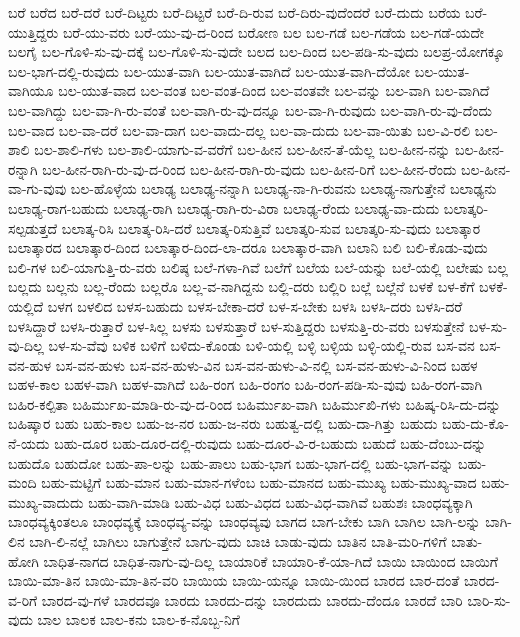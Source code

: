 {ಬರೆ
ಬರೆದ
ಬರೆ-ದರೆ
ಬರೆ-ದಿಟ್ಟರು
ಬರೆ-ದಿಟ್ಟರೆ
ಬರೆ-ದಿ-ರುವ
ಬರೆ-ದಿರು-ವುದೆಂದರೆ
ಬರೆ-ದುದು
ಬರೆಯ
ಬರೆ-ಯುತ್ತಿದ್ದರು
ಬರೆ-ಯು-ವರು
ಬರೆ-ಯು-ವು-ದ-ರಿಂದ
ಬರೋಣ
ಬಲ
ಬಲ-ಗಡೆ
ಬಲ-ಗಡೆಯ
ಬಲ-ಗಡೆ-ಯದೇ
ಬಲಗೈ
ಬಲ-ಗೊಳಿ-ಸು-ವು-ದಕ್ಕೆ
ಬಲ-ಗೊಳಿ-ಸು-ವುದೇ
ಬಲದ
ಬಲ-ದಿಂದ
ಬಲ-ಪಡಿ-ಸು-ವುದು
ಬಲಪ್ರ-ಯೋಗಕ್ಕೂ
ಬಲ-ಭಾಗ-ದಲ್ಲಿ-ರುವುದು
ಬಲ-ಯುತ-ವಾಗಿ
ಬಲ-ಯುತ-ವಾಗಿದೆ
ಬಲ-ಯುತ-ವಾಗಿ-ದೆಯೋ
ಬಲ-ಯುತ-ವಾಗಿಯೂ
ಬಲ-ಯುತ-ವಾದ
ಬಲ-ವಂತ
ಬಲ-ವಂತ-ದಿಂದ
ಬಲ-ವಂತವೇ
ಬಲ-ವನ್ನು
ಬಲ-ವಾಗಿ
ಬಲ-ವಾಗಿದೆ
ಬಲ-ವಾಗಿದ್ದು
ಬಲ-ವಾ-ಗಿ-ರು-ವಂತೆ
ಬಲ-ವಾಗಿ-ರು-ವು-ದನ್ನೂ
ಬಲ-ವಾ-ಗಿ-ರುವುದು
ಬಲ-ವಾಗಿ-ರು-ವು-ದೆಂದು
ಬಲ-ವಾದ
ಬಲ-ವಾ-ದರೆ
ಬಲ-ವಾ-ದಾಗ
ಬಲ-ವಾದು-ದಲ್ಲ
ಬಲ-ವಾ-ದುದು
ಬಲ-ವಾ-ಯಿತು
ಬಲ-ವಿ-ರಲಿ
ಬಲ-ಶಾಲಿ
ಬಲ-ಶಾಲಿ-ಗಳು
ಬಲ-ಶಾಲಿ-ಯಾಗು-ವ-ವರೆಗೆ
ಬಲ-ಹೀನ
ಬಲ-ಹೀನ-ತೆ-ಯೆಲ್ಲ
ಬಲ-ಹೀನ-ನನ್ನು
ಬಲ-ಹೀನ-ರನ್ನಾಗಿ
ಬಲ-ಹೀನ-ರಾಗಿ-ರು-ವು-ದ-ರಿಂದ
ಬಲ-ಹೀನ-ರಾಗಿ-ರು-ವುದು
ಬಲ-ಹೀನ-ರಿಗೆ
ಬಲ-ಹೀನ-ರೆಂದು
ಬಲ-ಹೀನ-ವಾ-ಗು-ವುವು
ಬಲ-ಹೊಳ್ಳೆಯ
ಬಲಾಢ್ಯ
ಬಲಾಢ್ಯ-ನನ್ನಾಗಿ
ಬಲಾಢ್ಯ-ನಾ-ಗಿ-ರುವನು
ಬಲಾಢ್ಯ-ನಾಗುತ್ತೇನೆ
ಬಲಾಢ್ಯನು
ಬಲಾಢ್ಯ-ರಾಗ-ಬಹುದು
ಬಲಾಢ್ಯ-ರಾಗಿ
ಬಲಾಢ್ಯ-ರಾಗಿ-ರು-ವಿರಾ
ಬಲಾಢ್ಯ-ರೆಂದು
ಬಲಾಢ್ಯ-ವಾ-ದುದು
ಬಲಾತ್ಕರಿ-ಸಲ್ಪಡುತ್ತದೆ
ಬಲಾತ್ಕ-ರಿಸಿ
ಬಲಾತ್ಕ-ರಿಸಿ-ದರೆ
ಬಲಾತ್ಕ-ರಿಸುತ್ತಿವೆ
ಬಲಾತ್ಕರಿ-ಸುವ
ಬಲಾತ್ಕರಿ-ಸು-ವುದು
ಬಲಾತ್ಕಾರ
ಬಲಾತ್ಕಾರದ
ಬಲಾತ್ಕಾರ-ದಿಂದ
ಬಲಾತ್ಕಾರ-ದಿಂದ-ಲಾ-ದರೂ
ಬಲಾತ್ಕಾರ-ವಾಗಿ
ಬಲಾನಿ
ಬಲಿ
ಬಲಿ-ಕೊಡು-ವುದು
ಬಲಿ-ಗಳ
ಬಲಿ-ಯಾಗುತ್ತಿ-ರು-ವರು
ಬಲಿಷ್ಠ
ಬಲೆ-ಗಳಾ-ಗಿವೆ
ಬಲೆಗೆ
ಬಲೆಯ
ಬಲೆ-ಯನ್ನು
ಬಲೆ-ಯಲ್ಲಿ
ಬಲೇಷು
ಬಲ್ಲ
ಬಲ್ಲದು
ಬಲ್ಲನು
ಬಲ್ಲ-ರೆಂದು
ಬಲ್ಲರೊ
ಬಲ್ಲ-ವ-ನಾಗಿದ್ದನು
ಬಲ್ಲಿ-ದರು
ಬಲ್ಲಿರಿ
ಬಲ್ಲೆ
ಬಲ್ಲೆನೆ
ಬಳಕೆ
ಬಳ-ಕೆಗೆ
ಬಳಕೆ-ಯಲ್ಲಿದೆ
ಬಳಗ
ಬಳಲಿದ
ಬಳಸ-ಬಹುದು
ಬಳಸ-ಬೇಕಾ-ದರೆ
ಬಳ-ಸ-ಬೇಕು
ಬಳಸಿ
ಬಳಸಿ-ದರು
ಬಳಸಿ-ದರೆ
ಬಳಸಿದ್ದಾರೆ
ಬಳಸಿ-ರುತ್ತಾರೆ
ಬಳ-ಸಿಲ್ಲ
ಬಳಸು
ಬಳಸುತ್ತಾರೆ
ಬಳ-ಸುತ್ತಿದ್ದರು
ಬಳಸುತ್ತಿ-ರು-ವರು
ಬಳಸುತ್ತೇನೆ
ಬಳ-ಸು-ವು-ದಿಲ್ಲ
ಬಳ-ಸು-ವೆವು
ಬಳಿಕ
ಬಳಿಗೆ
ಬಳಿದು-ಕೊಂಡು
ಬಳಿ-ಯಲ್ಲಿ
ಬಳ್ಳಿ
ಬಳ್ಳಿಯ
ಬಳ್ಳಿ-ಯಲ್ಲಿ-ರುವ
ಬಸ-ವನ
ಬಸ-ವನ-ಹುಳ
ಬಸ-ವನ-ಹುಳು
ಬಸ-ವನ-ಹುಳು-ವಿನ
ಬಸ-ವನ-ಹುಳು-ವಿ-ನಲ್ಲಿ
ಬಸ-ವನ-ಹುಳು-ವಿ-ನಿಂದ
ಬಹಳ
ಬಹಳ-ಕಾಲ
ಬಹಳ-ವಾಗಿ
ಬಹಳ-ವಾಗಿದೆ
ಬಹಿ-ರಂಗ
ಬಹಿ-ರಂಗಂ
ಬಹಿ-ರಂಗ-ಪಡಿ-ಸು-ವುವು
ಬಹಿ-ರಂಗ-ವಾಗಿ
ಬಹಿರ-ಕಲ್ಪಿತಾ
ಬಹಿರ್ಮುಖ-ಮಾಡಿ-ರು-ವು-ದ-ರಿಂದ
ಬಹಿರ್ಮುಖ-ವಾಗಿ
ಬಹಿರ್ಮುಖಿ-ಗಳು
ಬಹಿಷ್ಕ-ರಿಸಿ-ದು-ದನ್ನು
ಬಹಿಷ್ಕಾರ
ಬಹು
ಬಹು-ಕಾಲ
ಬಹು-ಜ-ನರ
ಬಹು-ಜ-ನರು
ಬಹುತ್ವ-ದಲ್ಲಿ
ಬಹು-ದಾ-ಗಿತ್ತು
ಬಹುದು
ಬಹು-ದು-ಕೊ-ನೆ-ಯದು
ಬಹು-ದೂರ
ಬಹು-ದೂರ-ದಲ್ಲಿ-ರುವುದು
ಬಹು-ದೂರ-ವಿ-ರ-ಬಹುದು
ಬಹುದೆ
ಬಹು-ದೆಂಬು-ದನ್ನು
ಬಹುದೊ
ಬಹುದೋ
ಬಹು-ಪಾ-ಲನ್ನು
ಬಹು-ಪಾಲು
ಬಹು-ಭಾಗ
ಬಹು-ಭಾಗ-ದಲ್ಲಿ
ಬಹು-ಭಾಗ-ವನ್ನು
ಬಹು-ಮಂದಿ
ಬಹು-ಮಟ್ಟಿಗೆ
ಬಹು-ಮಾನ
ಬಹು-ಮಾನ-ಗಳೆಂಬ
ಬಹು-ಮಾನದ
ಬಹು-ಮುಖ್ಯ
ಬಹು-ಮುಖ್ಯ-ವಾದ
ಬಹು-ಮುಖ್ಯ-ವಾದುದು
ಬಹು-ವಾಗಿ-ಮಾಡಿ
ಬಹು-ವಿಧ
ಬಹು-ವಿಧದ
ಬಹು-ವಿಧ-ವಾಗಿವೆ
ಬಹುಶಃ
ಬಾಂಧವ್ಯಕ್ಕಾಗಿ
ಬಾಂಧವ್ಯಕ್ಕಿಂತಲೂ
ಬಾಂಧವ್ಯಕ್ಕೆ
ಬಾಂಧವ್ಯ-ವನ್ನು
ಬಾಂಧವ್ಯವು
ಬಾಗದ
ಬಾಗ-ಬೇಕು
ಬಾಗಿ
ಬಾಗಿಲ
ಬಾಗಿ-ಲನ್ನು
ಬಾಗಿ-ಲಿನ
ಬಾಗಿ-ಲಿ-ನಲ್ಲೆ
ಬಾಗಿಲು
ಬಾಗುತ್ತೇನೆ
ಬಾಗು-ವುದು
ಬಾಚಿ
ಬಾಡು-ವುದು
ಬಾತಿನ
ಬಾತಿ-ಮರಿ-ಗಳಿಗೆ
ಬಾತು-ಹೋಗಿ
ಬಾಧಿತ-ನಾಗದ
ಬಾಧಿತ-ನಾಗು-ವು-ದಿಲ್ಲ
ಬಾಯಾರಿಕೆ
ಬಾಯಾರಿ-ಕೆ-ಯಾ-ಗಿದೆ
ಬಾಯಿ
ಬಾಯಿಂದ
ಬಾಯಿಗೆ
ಬಾಯಿ-ಮಾ-ತಿನ
ಬಾಯಿ-ಮಾ-ತಿನ-ವರಿ
ಬಾಯಿಯ
ಬಾಯಿ-ಯನ್ನೂ
ಬಾಯಿ-ಯಿಂದ
ಬಾರದ
ಬಾರ-ದಂತೆ
ಬಾರದ-ವ-ರಿಗೆ
ಬಾರದ-ವು-ಗಳೆ
ಬಾರದವೂ
ಬಾರದು
ಬಾರದು-ದನ್ನು
ಬಾರದುದು
ಬಾರದು-ದೆಂದೂ
ಬಾರದೆ
ಬಾರಿ
ಬಾರಿ-ಸು-ವುದು
ಬಾಲ
ಬಾಲಕ
ಬಾಲ-ಕನು
ಬಾಲ-ಕ-ನೊಬ್ಬ-ನಿಗೆ
}

